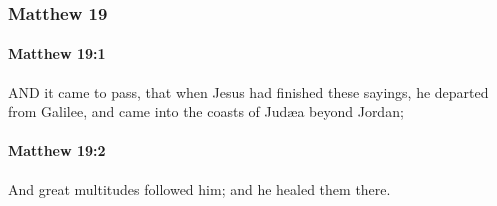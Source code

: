 	\subsubsection{Matthew 19} %
		\label{MATTHEW-19}
		
		\paragraph{Matthew 19:1} %
			\label{MATTHEW-19-1}

			AND it came to pass, that when Jesus had finished these sayings, he departed from Galilee, and came into the coasts of Judæa beyond Jordan;

			\begin{framed}
			\scriptsize
				\begin{compactdesc}
					\item[SBLG] 
				\end{compactdesc}
			\end{framed}

		\paragraph{Matthew 19:2} %
			\label{MATTHEW-19-2}

			And great multitudes followed him; and he healed them there.

